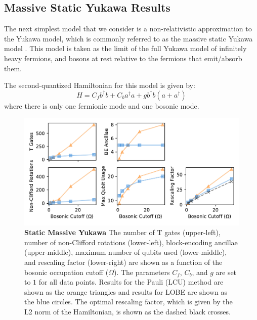 \subsection{Massive Static Yukawa Results}
\label{sec:static_yukawa}

The next simplest model that we consider is a non-relativistic approximation to the Yukawa model, which is commonly referred to as the massive static Yukawa model \cite{PhysRevD.103.014021}.
This model is taken as the limit of the full Yukawa model of infinitely heavy fermions, and bosons at rest relative to the fermions that emit/absorb them.

The second-quantized Hamiltonian for this model is given by:
\begin{equation}
    \label{eq:static-yukawa}
    H = C_f b^\dagger b + C_b a^\dagger a + g b^\dagger b \left( a + a^\dagger \right)
\end{equation}
where there is only one fermionic mode and one bosonic mode. 

\begin{figure}
    \label{fig:static_yukawa}
    \includegraphics[width = 16cm]{figures/static_yukawa.pdf}
    \caption{
        \textbf{Static Massive Yukawa}
        The number of T gates (upper-left), number of non-Clifford rotations (lower-left), block-encoding ancillae (upper-middle), maximum number of qubits used (lower-middle), and rescaling factor (lower-right) are shown as a function of the bosonic occupation cutoff ($\Omega$).
        The parameters $C_f$, $C_b$, and $g$ are set to $1$ for all data points.
        Results for the Pauli (LCU) method are shown as the orange triangles and results for LOBE are shown as the blue circles.
        The optimal rescaling factor, which is given by the L2 norm of the Hamiltonian, is shown as the dashed black crosses.
    }
\end{figure}

